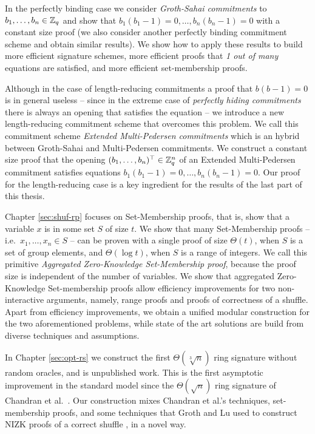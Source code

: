 In the perfectly binding case we consider \emph{Groth-Sahai commitments} to $b_1,\ldots,\allowbreak b_n\allowbreak\in\mathbb{Z}_q$ and show that $b_1(b_1-1)=0,\ldots,b_n(b_n-1)=0$ with a constant size proof (we also consider another perfectly binding commitment scheme and obtain similar results). We show how to apply these results to build more efficient signature schemes, more efficient proofs that \emph{1 out of many} equations are satisfied, and more efficient set-membership proofs.

Although in the case of length-reducing commitments a proof that $b(b-1)=0$ is in general useless -- since in the extreme case of \emph{perfectly hiding commitments} there is always an opening that satisfies the equation -- we introduce a new length-reducing commitment scheme that overcomes this problem. We call this commitment scheme \emph{Extended Multi-Pedersen commitments} which is an hybrid between Groth-Sahai and Multi-Pedersen commitments. We construct a constant size proof that the opening $(b_1,\ldots,b_n)^\top\in\mathbb{Z}_q^n$ of an Extended Multi-Pedersen commitment satisfies equations $b_1(b_1-1)=0,\ldots,b_n(b_n-1)=0$.
Our proof for the length-reducing case is a key ingredient for the results of the last part of this thesis.
 
Chapter \ref{sec:shuf-rp} focuses on Set-Membership proofs, that is, show that a variable $x$ is in some set $S$ of size $t$. We show that many Set-Membership proofs -- i.e.~$x_1,\ldots,x_n\in S$ -- can be proven with a single proof of size $\Theta(t)$, when $S$ is a set of group elements, and $\Theta(\log t)$, when $S$ is a range of integers. We call this primitive \emph{Aggregated Zero-Knowledge Set-Membership proof}, because the proof size is independent of the number of variables. We show that aggregated Zero-Knowledge Set-membership proofs allow efficiency improvements for two non-interactive arguments, namely, range proofs and proofs of correctness of a shuffle. Apart from efficiency improvements, we obtain a unified modular construction for the two aforementioned problems, while state of the art solutions are build from diverse techniques and assumptions.

In Chapter \ref{sec:opt-rs} we construct the first $\Theta(\sqrt[3]{n})$ ring signature without random oracles, and is unpublished work.
This is the first asymptotic improvement in the standard model since the $\Theta(\sqrt{n})$ ring signature of Chandran et al.~\cite{ICALP:ChaGroSah07}.
Our construction mixes Chandran et al.'s techniques, set-membership proofs, and some techniques that Groth and Lu used to construct NIZK proofs of a correct shuffle \cite{AC:GroLu07}, in a novel way.


